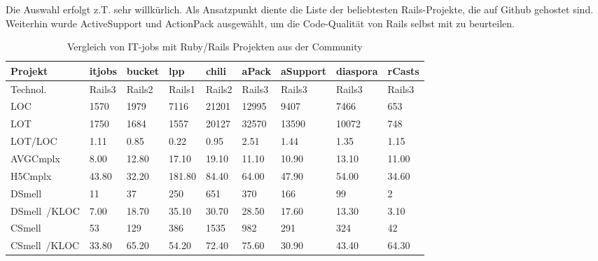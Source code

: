 Die Auswahl erfolgt z.T. sehr willkürlich. Als Ansatzpunkt diente die Liste der beliebtesten Rails-Projekte, die auf Github gehostet sind. Weiterhin wurde ActiveSupport und ActionPack ausgewählt, um die Code-Qualität von Rails selbst mit zu beurteilen.

\begin{table}[hbp]
 \caption{Vergleich von IT-jobs mit Ruby/Rails Projekten aus der Community}\label{table:cmpother}
 \begin{tabular}{|p{1.8cm}|l|l|l|l|l|l|l|l|}
\hline \rowcolor{tableheadcolor}
 Projekt&itjobs&bucket&lpp&chili&aPack&aSupport&diaspora&rCasts\\
\hline
Technol.&Rails3&Rails2&Rails1&Rails2&Rails3&Rails3&Rails3&Rails3\\
\hline
LOC&1570&1979&7116&21201&12995&9407&7466&653\\
\hline
LOT&1750&1684&1557&20127&32570&13590&10072&748\\
\hline
LOT/LOC&1.11&0.85&0.22&0.95&2.51&1.44&1.35&1.15\\
\hline
AVGCmplx&8.00&12.80&17.10&19.10&11.10&10.90&13.10&11.00\\
\hline
H5Cmplx&43.80&32.20&181.80&84.40&64.00&47.90&54.00&34.60\\
\hline
DSmell&11&37&250&651&370&166&99&2\\
\hline
DSmell\newline~/KLOC&7.00&18.70&35.10&30.70&28.50&17.60&13.30&3.10\\
\hline
CSmell&53&129&386&1535&982&291&324&42\\
\hline
CSmell\newline~/KLOC&33.80&65.20&54.20&72.40&75.60&30.90&43.40&64.30\\
\hline
\end{tabular}
\end{table}

